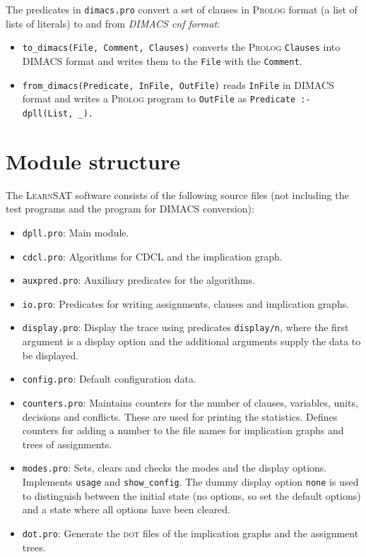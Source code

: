 \documentclass[11pt]{article}
\newcommand*{\p}[1]{\textup{\texttt{#1}}}
\newcommand*{\ls}{\textsc{LearnSAT}}
\newcommand*{\pl}{\textsc{Prolog}}
\newcommand*{\dt}{\textsc{dot}}
\begin{document}
The predicates in \p{dimacs.pro} convert a set of clauses in
\pl{} format (a list of lists of literals) to and from \emph{DIMACS cnf
format}:
\begin{itemize}
\item \p{to\_dimacs(File, Comment, Clauses)} converts the \pl{}
\p{Clauses} into DIMACS format and writes them to the \p{File} with the
\p{Comment}.
\item \p{from\_dimacs(Predicate, InFile, OutFile)} reads \p{InFile} in
DIMACS format and writes a \pl{} program to \p{OutFile} as
\verb+Predicate :- dpll(List, _).+
\end{itemize}


\section{Module structure}\label{s.module}

The \ls{} software consists of the following source files (not including the test programs and the program for DIMACS conversion):

\begin{itemize}
\item \p{dpll.pro}: Main module.

\item \p{cdcl.pro}: Algorithms for CDCL and the implication graph.

\item \p{auxpred.pro}: Auxiliary predicates for the algorithms. 

\item \p{io.pro}: Predicates for writing assignments, clauses and
implication graphs.

\item \p{display.pro}: Display the trace using predicates \p{display/n},
where the first argument is a display option and the additional
arguments supply the data to be displayed.

\item \p{config.pro}: Default configuration data.

\item \p{counters.pro}: Maintains counters for the number of clauses, variables, units, decisions and conflicts. These are used for printing the statistics. Defines counters for adding a number to the file names for implication graphs and trees of assignments.

\item \p{modes.pro}: Sets, clears and checks the modes and the display options. Implements \p{usage} and \p{show\_config}. The dummy display option \p{none} is used to distinguish between the initial state (no options, so set the default options) and a state where all options have been cleared.

\item \p{dot.pro}: Generate the \dt{} files of the implication graphs
and the assignment trees.
\end{itemize}
\end{document}
